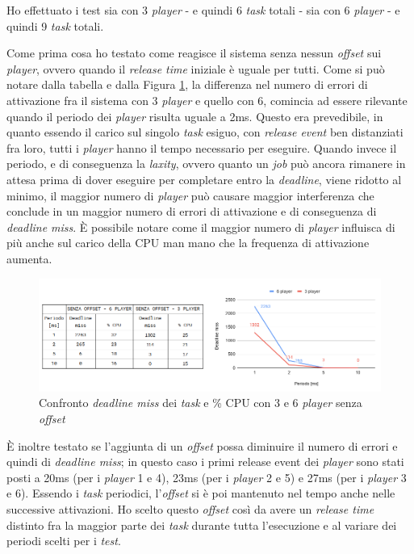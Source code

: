 \documentclass{article}
\begin{document}
Ho effettuato i test sia con 3 \textit{player} - e quindi 6 \textit{task} totali - sia con 6 \textit{player} - e quindi 9 \textit{task} totali. 

Come prima cosa ho testato come reagisce il sistema senza nessun \textit{offset} sui \textit{player}, ovvero quando il \textit{release time} iniziale è uguale per tutti. Come si può notare dalla tabella e dalla Figura \ref{noC-noO}, la differenza nel numero di errori di attivazione fra il sistema con 3 \textit{player} e quello con 6, comincia ad essere rilevante quando il periodo dei \textit{player} risulta uguale a 2ms. Questo era prevedibile, in quanto essendo il carico sul singolo \textit{task} esiguo, con \textit{release event} ben distanziati fra loro, tutti i \textit{player} hanno il tempo necessario per eseguire. Quando invece il periodo, e di conseguenza la \textit{laxity}, ovvero quanto un \textit{job} può ancora rimanere in attesa prima di dover eseguire per completare entro la \textit{deadline}, viene ridotto al minimo, il maggior numero di \textit{player} può causare maggior interferenza che conclude in un maggior numero di errori di attivazione e di conseguenza di \textit{deadline miss}. È possibile notare come il maggior numero di \textit{player} influisca di più anche sul carico della CPU man mano che la frequenza di attivazione aumenta.
\begin{figure}[H]
	\centering
	\includegraphics[width=6in]{image/NO_CARICO-AUTOSTART.png}
	\caption{Confronto \textit{deadline miss} dei \textit{task} e \% CPU con 3 e 6 \textit{player} senza \textit{offset}}
	\label{noC-noO}
\end{figure}
È inoltre testato se l'aggiunta di un \textit{offset} possa diminuire il numero di errori e quindi di \textit{deadline miss}; in questo caso i primi release event dei \textit{player} sono stati posti a 20ms (per i \textit{player} 1 e 4), 23ms (per i \textit{player} 2 e 5) e 27ms (per i \textit{player} 3 e 6). Essendo i \textit{task} periodici, l'\textit{offset} si è poi mantenuto nel tempo anche nelle successive attivazioni. Ho scelto questo \textit{offset} così da avere un \textit{release time} distinto fra la maggior parte dei \textit{task} durante tutta l'esecuzione e al variare dei periodi scelti per i \textit{test}.
\end{document}
